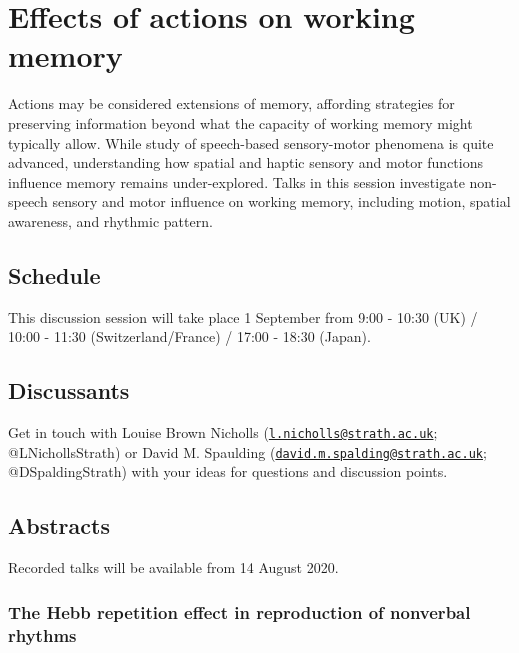 \documentclass[
  12pt,
]{book}
\begin{document}
\hypertarget{effects-of-actions-on-working-memory}{%
\chapter{Effects of actions on working memory}\label{effects-of-actions-on-working-memory}}

Actions may be considered extensions of memory, affording strategies for preserving information beyond what the capacity of working memory might typically allow. While study of speech-based sensory-motor phenomena is quite advanced, understanding how spatial and haptic sensory and motor functions influence memory remains under-explored. Talks in this session investigate non-speech sensory and motor influence on working memory, including motion, spatial awareness, and rhythmic pattern.

\hypertarget{schedule}{%
\section{Schedule}\label{schedule}}

This discussion session will take place 1 September from 9:00 - 10:30 (UK) / 10:00 - 11:30 (Switzerland/France) / 17:00 - 18:30 (Japan).

\hypertarget{discussants}{%
\section{Discussants}\label{discussants}}

Get in touch with Louise Brown Nicholls (\href{mailto:l.nicholls@strath.ac.uk}{\nolinkurl{l.nicholls@strath.ac.uk}}; @LNichollsStrath) or David M. Spaulding (\href{mailto:david.m.spalding@strath.ac.uk}{\nolinkurl{david.m.spalding@strath.ac.uk}}; @DSpaldingStrath) with your ideas for questions and discussion points.

\hypertarget{abstracts}{%
\section{Abstracts}\label{abstracts}}

Recorded talks will be available from 14 August 2020.

\hypertarget{the-hebb-repetition-effect-in-reproduction-of-nonverbal-rhythms}{%
\subsection{The Hebb repetition effect in reproduction of nonverbal rhythms}\label{the-hebb-repetition-effect-in-reproduction-of-nonverbal-rhythms}}
\end{document}
